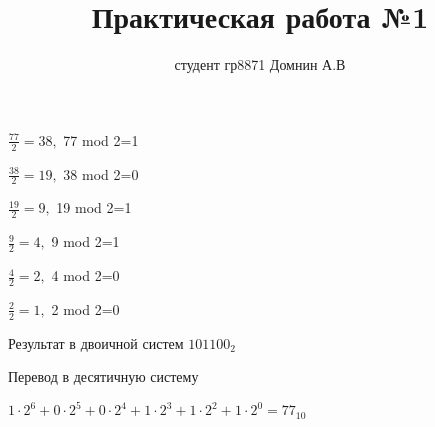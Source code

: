\documentclass[a4paper,11pt]{article}
\title{Практическая работа №1}
\author{студент гр8871 Домнин А.В }
\begin{document}
\maketitle
$
\frac {77}{2}=38,
$
 {77} mod {2}=1 

$
\frac {38}{2}=19,
$
 {38} mod {2}=0 

$
\frac {19}{2}=9,
$
 {19} mod {2}=1 

$
\frac {9}{2}=4,
$
 {9} mod {2}=1 

$
\frac {4}{2}=2,
$
 {4} mod {2}=0 

$
\frac {2}{2}=1,
$
 {2} mod {2}=0 

Результат в двоичной систем  
$101100_{2}$

Перевод в десятичную систему

$1\cdot2^6+0\cdot2^5+0\cdot2^4+1\cdot2^3+1\cdot2^2+1\cdot2^0=77_{10}$
\end{document}
